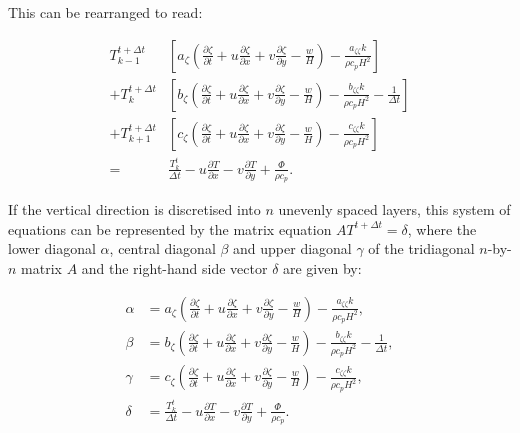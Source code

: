 \documentclass{article}
\begin{document}
This can be rearranged to read:

\begin{equation}
\begin{split}
T_{k-1}^{t+\Delta t} & \left[ a_{\zeta} \left( \frac{\partial \zeta}{\partial t} + u \frac{\partial \zeta}{\partial x} + v \frac{\partial \zeta}{\partial y} - \frac{w}{H} \right) - \frac{a_{\zeta \zeta} k}{\rho c_p H^2} \right] \\
+ T_k^{t+\Delta t} & \left[ b_{\zeta} \left( \frac{\partial \zeta}{\partial t} + u \frac{\partial \zeta}{\partial x} + v \frac{\partial \zeta}{\partial y} - \frac{w}{H} \right) - \frac{b_{\zeta \zeta} k}{\rho c_p H^2} - \frac{1}{\Delta t} \right] \\
+ T_{k+1}^{t+\Delta t} & \left[ c_{\zeta} \left( \frac{\partial \zeta}{\partial t} + u \frac{\partial \zeta}{\partial x} + v \frac{\partial \zeta}{\partial y} - \frac{w}{H} \right) - \frac{c_{\zeta \zeta} k}{\rho c_p H^2} \right] \\
= & \frac{T_k^t}{\Delta t} - u \frac{\partial T}{\partial x} - v \frac{\partial T}{\partial y} + \frac{\Phi}{\rho c_p}.
\end{split}
\end{equation}

If the vertical direction is discretised into $n$ unevenly spaced layers, this system of equations can be represented by the matrix equation $A T^{t+\Delta t} = \delta$, where the lower diagonal $\alpha$, central diagonal $\beta$ and upper diagonal $\gamma$ of the tridiagonal $n$-by-$n$ matrix $A$ and the right-hand side vector $\delta$ are given by:

\begin{align}
\alpha &= a_{\zeta} \left( \frac{\partial \zeta}{\partial t} + u \frac{\partial \zeta}{\partial x} + v \frac{\partial \zeta}{\partial y} - \frac{w}{H} \right) - \frac{a_{\zeta \zeta} k}{\rho c_p H^2}, \\
\beta &= b_{\zeta} \left( \frac{\partial \zeta}{\partial t} + u \frac{\partial \zeta}{\partial x} + v \frac{\partial \zeta}{\partial y} - \frac{w}{H} \right) - \frac{b_{\zeta \zeta} k}{\rho c_p H^2} - \frac{1}{\Delta t}, \\
\gamma &= c_{\zeta} \left( \frac{\partial \zeta}{\partial t} + u \frac{\partial \zeta}{\partial x} + v \frac{\partial \zeta}{\partial y} - \frac{w}{H} \right) - \frac{c_{\zeta \zeta} k}{\rho c_p H^2}, \\
\delta &= \frac{T_k^t}{\Delta t} - u \frac{\partial T}{\partial x} - v \frac{\partial T}{\partial y} + \frac{\Phi}{\rho c_p}.
\end{align}
\end{document}
